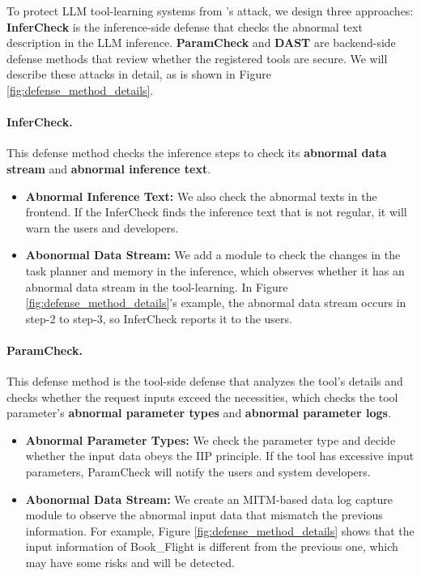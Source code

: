 To protect LLM tool-learning systems from {\tool}'s attack, we design three approaches: \textbf{InferCheck} is the inference-side defense that checks the abnormal text description in the LLM inference.
\textbf{ParamCheck} and \textbf{DAST} are backend-side defense methods that review whether the registered tools are secure. We will describe these attacks in detail, as is shown in Figure \ref{fig:defense_method_details}.




\paragraph{InferCheck.}
This defense method checks the inference steps to check its \textbf{abnormal data stream} and \textbf{abnormal inference text}.

\begin{itemize}[leftmargin=*]
    \item \textbf{Abnormal Inference Text:} We also check the abnormal texts in the frontend. If the InferCheck finds the inference text that is not regular, it will warn the users and developers.
    \item \textbf{Abonormal Data Stream:} We add a module to check the changes in the task planner and memory in the inference, which observes whether it has an abnormal data stream in the tool-learning. In Figure \ref{fig:defense_method_details}'s example, the abnormal data stream occurs in step-2 to step-3, so InferCheck reports it to the users.
\end{itemize}


\paragraph{ParamCheck.} 
This defense method is the tool-side defense that analyzes the tool's details and checks whether the request inputs exceed the necessities, which checks the tool parameter's \textbf{abnormal parameter types} and \textbf{abnormal parameter logs}.

\begin{itemize}[leftmargin=*]
    \item \textbf{Abnormal Parameter Types:} We check the parameter type and decide whether the input data obeys the IIP principle. If the tool has excessive input parameters, ParamCheck will notify the users and system developers.
    \item \textbf{Abonormal Data Stream:} We create an MITM-based data log capture module to observe the abnormal input data that mismatch the previous information. For example, Figure \ref{fig:defense_method_details} shows that the input information of Book\_Flight is different from the previous one, which may have some risks and will be detected.
\end{itemize}


